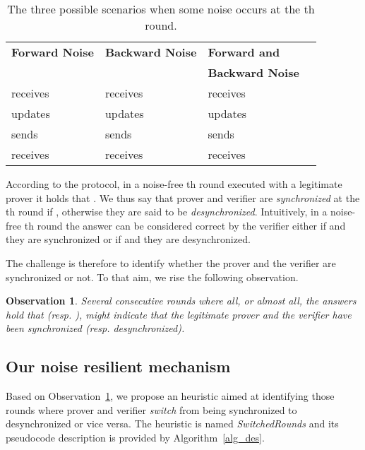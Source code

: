\documentclass{llncs}
\newtheorem{observation}{Observation}
\begin{document}
\begin{table*}
\centering
 {\renewcommand\normalsize{\footnotesize}\normalsize
\begin{tabular}{|l|l|l|l|} \hline
\textbf{Forward Noise} & \textbf{Backward Noise} & \textbf{Forward and}\\
&&\textbf{Backward Noise} \\
\hline
 receives  &  receives   & 
 receives  \\
 updates & updates &  updates \\
 sends & sends 
&  sends \\
 receives & receives &  
receives \\\hline
\end{tabular}}
\vspace{10pt}
\caption{The three possible scenarios when some noise occurs at the th 
round.}
\label{table_noise}
\end{table*}


According to the protocol, in a noise-free th round 
executed with a legitimate prover it holds that . We thus say that prover and 
verifier are \emph{synchronized} at the th round if , otherwise they are said to be \emph{desynchronized}. 
Intuitively, in a noise-free th round the answer  can be 
considered correct by the verifier either if  and they are 
synchronized or if  and they are desynchronized. 

The challenge is therefore to identify whether the prover and the verifier are 
synchronized or not. To that aim, we rise the following observation.


\begin{observation}\label{obs_sync}
Several consecutive rounds where all, or almost all, the answers hold that  (resp. ), might indicate that the 
legitimate prover and the verifier have been synchronized (resp. 
desynchronized). 
\end{observation}



\subsection{Our noise resilient mechanism}\label{sec:noise}

Based on Observation~\ref{obs_sync}, we propose an heuristic aimed at 
identifying those rounds where prover and verifier \emph{switch} from being 
synchronized to desynchronized or vice versa. The heuristic is named 
\emph{SwitchedRounds} and its pseudocode description is provided by 
Algorithm~\ref{alg_des}.
\end{document}
